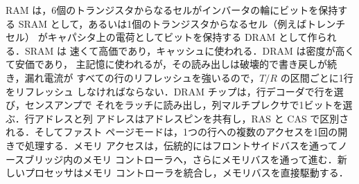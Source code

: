 \documentclass[../main.tex]{subfiles}
\begin{document}
\begin{keypoint}[章のまとめ]
  RAM は，6個のトランジスタからなるセルがインバータの輪にビットを保持する
  SRAM として，あるいは1個のトランジスタからなるセル（例えばトレンチセル）
  がキャパシタ上の電荷としてビットを保持する DRAM として作られる．SRAM は
  速くて高価であり，キャッシュに使われる．DRAM は密度が高くて安価であり，
  主記憶に使われるが，その読み出しは破壊的で書き戻しが続き，漏れ電流が
  すべての行のリフレッシュを強いるので，$T/R$ の区間ごとに1行をリフレッシュ
  しなければならない．DRAM チップは，行デコーダで行を選び，センスアンプで
  それをラッチに読み出し，列マルチプレクサで1ビットを選ぶ．行アドレスと列
  アドレスはアドレスピンを共有し，RAS と CAS で区別される．そしてファスト
  ページモードは，1つの行への複数のアクセスを1回の開きで処理する．メモリ
  アクセスは，伝統的にはフロントサイドバスを通ってノースブリッジ内のメモリ
  コントローラへ，さらにメモリバスを通って進む．新しいプロセッサはメモリ
  コントローラを統合し，メモリバスを直接駆動する．
\end{keypoint}
\end{document}
